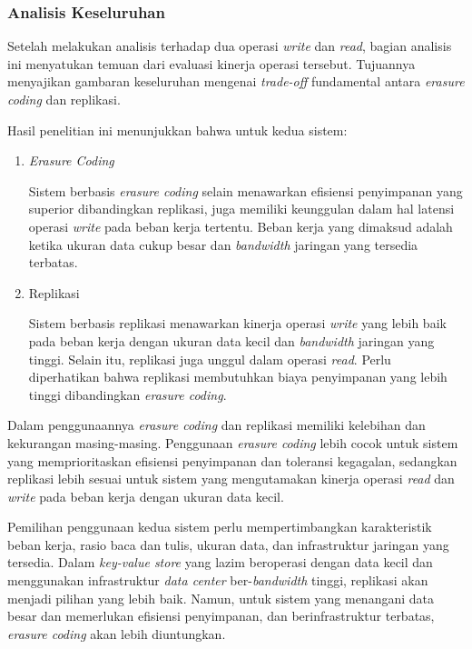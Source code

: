 \subsubsection{Analisis Keseluruhan}
\label{subsubsection:analisis-keseluruhan}

Setelah melakukan analisis terhadap dua operasi \textit{write} dan \textit{read}, bagian analisis ini menyatukan temuan dari evaluasi kinerja operasi tersebut. Tujuannya menyajikan gambaran keseluruhan mengenai \textit{trade-off} fundamental antara \textit{erasure coding} dan replikasi.

Hasil penelitian ini menunjukkan bahwa untuk kedua sistem:
\begin{enumerate}
  \item \textit{Erasure Coding}
  
  Sistem berbasis \textit{erasure coding} selain menawarkan efisiensi penyimpanan yang superior dibandingkan replikasi, juga memiliki keunggulan dalam hal latensi operasi \textit{write} pada beban kerja tertentu. Beban kerja yang dimaksud adalah ketika ukuran data cukup besar dan \textit{bandwidth} jaringan yang tersedia terbatas.

  \item Replikasi
  
  Sistem berbasis replikasi menawarkan kinerja operasi \textit{write} yang lebih baik pada beban kerja dengan ukuran data kecil dan \textit{bandwidth} jaringan yang tinggi. Selain itu, replikasi juga unggul dalam operasi \textit{read}. Perlu diperhatikan bahwa replikasi membutuhkan biaya penyimpanan yang lebih tinggi dibandingkan \textit{erasure coding}.

\end{enumerate}

Dalam penggunaannya \textit{erasure coding} dan replikasi memiliki kelebihan dan kekurangan masing-masing. Penggunaan \textit{erasure coding} lebih cocok untuk sistem yang memprioritaskan efisiensi penyimpanan dan toleransi kegagalan, sedangkan replikasi lebih sesuai untuk sistem yang mengutamakan kinerja operasi \textit{read} dan \textit{write} pada beban kerja dengan ukuran data kecil.

Pemilihan penggunaan kedua sistem perlu mempertimbangkan karakteristik beban kerja, rasio baca dan tulis, ukuran data, dan infrastruktur jaringan yang tersedia. Dalam \textit{key-value store} yang lazim beroperasi dengan data kecil dan menggunakan infrastruktur \textit{data center} ber-\textit{bandwidth} tinggi, replikasi akan menjadi pilihan yang lebih baik. Namun, untuk sistem yang menangani data besar dan memerlukan efisiensi penyimpanan, dan berinfrastruktur terbatas, \textit{erasure coding} akan lebih diuntungkan.
